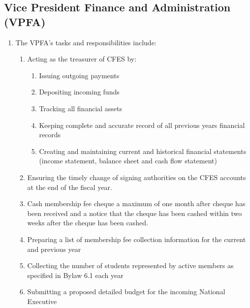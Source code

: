 \subsection{Vice President Finance and Administration (VPFA)}
\label{vice-president-finance-and-administration-vpfa}

\begin{enumerate}
 \item
  The VPFA's tasks and responsibilities include:

  \begin{enumerate}
   \item
    Acting as the treasurer of CFES by:

    \begin{enumerate}
     \item
      Issuing outgoing payments
     \item
      Depositing incoming funds
     \item
      Tracking all financial assets
     \item
      Keeping complete and accurate record of all previous years financial records
     \item
      Creating and maintaining current and historical financial statements (income statement, balance sheet and cash flow statement)
    \end{enumerate}
   \item
    Ensuring the timely change of signing authorities on the CFES accounts at the end of the fiscal year.
   \item
    Cash membership fee cheque a maximum of one month after cheque has been received and a notice that the cheque has been cashed within two weeks after the cheque has been cashed.
   \item
    Preparing a list of membership fee collection information for the current and previous year
   \item
    Collecting the number of students represented by active members as specified in Bylaw 6.1 each year
   \item
    Submitting a proposed detailed budget for the incoming National Executive


\end{enumerate}
\end{enumerate}
